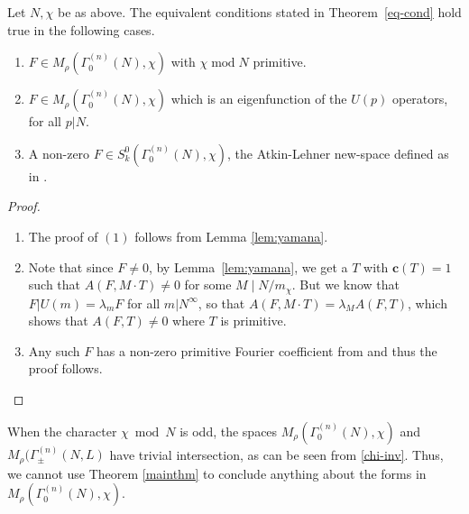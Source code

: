 \documentclass[11pt]{amsart}
\numberwithin{equation}{section}
\newcommand{\mf}{\mathbf}
\renewcommand*{\mod}{\operatorname{mod}}
\begin{document}
\begin{corollary}\label{cor:Nchi}
    Let $N, 
    \chi$ be as above. The equivalent conditions stated in Theorem~\ref{eq-cond} hold true in the following cases.
    \begin{enumerate}
        \item 
        $F \in M_{\rho}(\Gamma_{0}^{(n)}(N), \chi)$ with $\chi \mod N$ primitive.

        \item 
        $F \in M_{\rho}(\Gamma_{0}^{(n)}(N), \chi)$ which is an eigenfunction of  the $U(p)$ operators, for all $p|N$.

        \item A non-zero $F\in S_k^0(\Gamma_0^{(n)}(N), \chi)$, the Atkin-Lehner new-space defined as in \cite{ibukiyama2012atkin}.

    \end{enumerate}
\end{corollary}

\begin{proof}
\begin{enumerate}
    \item The proof of $(1)$ follows from Lemma \ref{lem:yamana}. 

    \item  Note that since $F \neq 0$, by  Lemma~\ref{lem:yamana}, we get a $T$ with $\mf c(T)=1$ such that $A(F, M\cdot T) \neq 0$ for some $M \mid N/m_\chi$. But we know that $F|U(m)= \lambda_m F$ for all $m|N^\infty$, so that $A(F, M\cdot T) = \lambda_M A(F,T)$, which shows that $A(F,T) \neq 0$ where $T$ is primitive.
    
    \item Any such $F$ has a non-zero primitive Fourier coefficient from \cite[Theorem 2]{ibukiyama2012atkin} and thus the proof follows. \qedhere
\end{enumerate}
\end{proof}
\begin{remark}
 When the character $\chi\bmod N$ is odd, the spaces  $M_\rho(\Gamma_0^{(n)}(N), \chi)$ and $M_\rho(\Gamma_\pm ^{(n)}(N,L)$  have trivial intersection, as can be seen from \eqref{chi-inv}. Thus, we cannot use Theorem \ref{mainthm} to conclude anything about the forms in  $M_\rho(\Gamma_0^{(n)}(N), \chi)$.
\end{remark}
\end{document}
